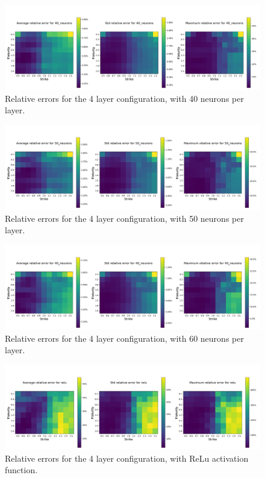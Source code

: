 \documentclass{article}
\theoremstyle{remark}
\begin{document}
\begin{figure}[h!]
  \centering
  \includegraphics[width=\linewidth]{../data/rBergomiTermStructureNNErrors_Model_40_neurons_8.png}
  \caption{Relative errors for the 4 layer configuration, with 40 neurons per layer.}
  \label{fig:40_neurons}
\end{figure}

\begin{figure}[h!]
  \centering
  \includegraphics[width=\linewidth]{../data/rBergomiTermStructureNNErrors_Model_50_neurons_9.png}
  \caption{Relative errors for the 4 layer configuration, with 50 neurons per layer.}
  \label{fig:50_neurons}
\end{figure}

\begin{figure}[h!]
  \centering
  \includegraphics[width=\linewidth]{../data/rBergomiTermStructureNNErrors_Model_40_neurons_10.png}
  \caption{Relative errors for the 4 layer configuration, with 60 neurons per layer.}
  \label{fig:60_neurons}
\end{figure}

\begin{figure}[h!]
  \centering
  \includegraphics[width=\linewidth]{../data/rBergomiTermStructureNNErrors_Model_relu_4.png}
  \caption{Relative errors for the 4 layer configuration, with ReLu activation function.}
  \label{fig:relu}
\end{figure}
\end{document}
